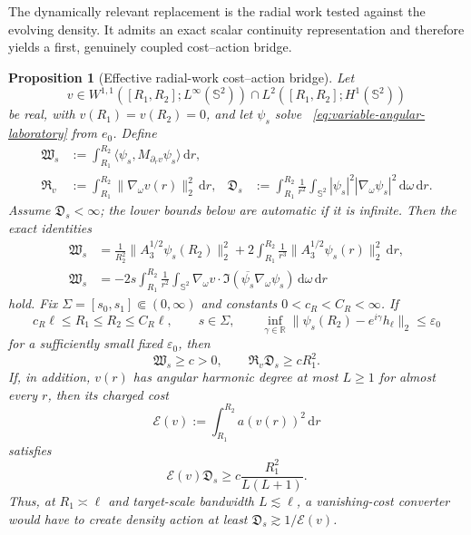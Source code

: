 \documentclass[11pt]{article}
\newcommand{\dd}{\,\mathrm d}
\newtheorem{proposition}[theorem]{Proposition}
\theoremstyle{definition}
\theoremstyle{remark}
\begin{document}
The dynamically relevant replacement is the radial work tested against the
evolving density.  It admits an exact scalar continuity representation and
therefore yields a first, genuinely coupled cost--action bridge.

\begin{proposition}[Effective radial-work cost--action bridge]
\label{prop:effective-radial-work-bridge}
Let
\begin{equation}
 v\in W^{1,1}([R_1,R_2];L^\infty(\mathbb S^2))
 \cap L^2([R_1,R_2];H^1(\mathbb S^2))
\end{equation}
be real, with $v(R_1)=v(R_2)=0$, and let $\psi_s$ solve
~\eqref{eq:variable-angular-laboratory} from $e_0$.  Define
\begin{align}
 \mathfrak W_s
 &:=\int_{R_1}^{R_2}
 \langle\psi_s,M_{\partial_rv}\psi_s\rangle\dd r,
 \label{eq:effective-radial-work}\\
 \mathfrak R_v
 &:=\int_{R_1}^{R_2}\|\nabla_\omega v(r)\|_2^2\dd r,
 &
 \mathfrak D_s
 &:=\int_{R_1}^{R_2}\frac1{r^2}
 \int_{\mathbb S^2}|\psi_s|^2|\nabla_\omega\psi_s|^2
 \dd\omega\dd r.
 \label{eq:radial-work-factors}
\end{align}
Assume $\mathfrak D_s<\infty$; the lower bounds below are automatic if it is
infinite.
Then the exact identities
\begin{align}
 \mathfrak W_s
 &=\frac1{R_2^2}\|A_3^{1/2}\psi_s(R_2)\|_2^2
   +2\int_{R_1}^{R_2}\frac1{r^3}
       \|A_3^{1/2}\psi_s(r)\|_2^2\dd r,
 \label{eq:radial-work-energy-identity}\\
 \mathfrak W_s
 &=-2s\int_{R_1}^{R_2}\frac1{r^2}
 \int_{\mathbb S^2}
 \nabla_\omega v\cdot
 \Im(\overline{\psi_s}\nabla_\omega\psi_s)
 \dd\omega\dd r
 \label{eq:radial-work-current-identity}
\end{align}
hold.  Fix $\Sigma=[s_0,s_1]\Subset(0,\infty)$ and constants
$0<c_R<C_R<\infty$.  If
\begin{equation}
 c_R\ell\leq R_1\leq R_2\leq C_R\ell,
 \qquad s\in\Sigma,
 \qquad
 \inf_{\gamma\in\mathbb R}
 \|\psi_s(R_2)-e^{i\gamma}h_\ell\|_2\leq\varepsilon_0
 \label{eq:radial-work-conversion-hypothesis}
\end{equation}
for a sufficiently small fixed $\varepsilon_0$, then
\begin{equation}
 \mathfrak W_s\geq c>0,
 \qquad
 \mathfrak R_v\mathfrak D_s\geq cR_1^2.
 \label{eq:radial-work-product-toll}
\end{equation}
If, in addition, $v(r)$ has angular harmonic degree at most $L\geq1$ for
almost every $r$, then its charged cost
\begin{equation}
 \mathcal E(v):=\int_{R_1}^{R_2}a(v(r))^2\dd r
\end{equation}
satisfies
\begin{equation}
 \mathcal E(v)\mathfrak D_s
 \geq c\frac{R_1^2}{L(L+1)}.
 \label{eq:bandlimited-cost-action-bridge}
\end{equation}
Thus, at $R_1\asymp\ell$ and target-scale bandwidth $L\lesssim\ell$, a
vanishing-cost converter would have to create density action at least
$\mathfrak D_s\gtrsim1/\mathcal E(v)$.
\end{proposition}
\end{document}
